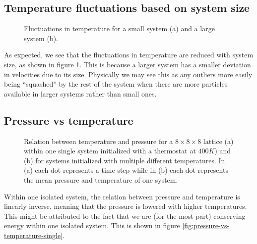 \documentclass[reprint,floatfix,amsmath,amssymb,aps,pra]{revtex4-1}
\begin{document}
\subsection{Temperature fluctuations based on system size}

\begin{figure}
    \centering
     \label{fig:temperature-fluctuations-small}
     \label{fig:temperature-fluctuations-large}
    \caption{Fluctuations in temperature for a small system (a) and a large system (b).}
    \label{fig:temperature-fluctuations}
\end{figure}

As expected, we see that the fluctuations in temperature are reduced with system size, as shown in figure \ref{fig:temperature-fluctuations}. This is because a larger system has a smaller deviation in velocities due to its size. Physically we may see this as any outliers more easily being ``squashed'' by the rest of the system when there are more particles available in larger systems rather than small ones.

\subsection{Pressure vs temperature}
\begin{figure}
    \centering
     \label{fig:pressure-vs-temperature-single}
     \label{fig:pressure-vs-temperature-multiple}
  \caption{Relation between temperature and pressure for a $8 \times 8 \times 8$ lattice (a) within one single system initialized with a thermostat at $400 \unit{K}$) and (b) for systems initialized with multiple different temperatures. In (a) each dot represents a time step while in (b) each dot represents the mean pressure and temperature of one system.}
  \label{fig:pressure-vs-temperature}
\end{figure}
Within one isolated system, the relation between pressure and temperature is linearly inverse, meaning that the pressure is lowered with higher temperatures. This might be attributed to the fact that we are (for the most part) conserving energy within one isolated system. This is shown in figure \ref{fig:pressure-vs-temperature-single}.
\end{document}
